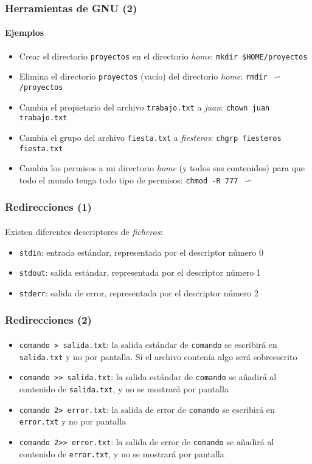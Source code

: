 \documentclass[12pt]{beamer}
\begin{document}
\begin{frame}
  \frametitle{Herramientas de GNU (2)}
  \framesubtitle{Ejemplos}
  \begin{itemize}
    \item Crear el directorio \texttt{proyectos} en el directorio \textit{home}: \texttt{mkdir \$HOME/proyectos}
    \medskip
    \item Elimina el directorio \texttt{proyectos} (\alert{vacío}) del directorio \textit{home}: \texttt{rmdir $\backsim$/proyectos}
    \medskip
    \item Cambia el propietario del archivo \texttt{trabajo.txt} a \textit{juan}: \texttt{chown juan trabajo.txt}
    \medskip
    \item Cambia el grupo del archivo \texttt{fiesta.txt} a \textit{fiesteros}: \texttt{chgrp fiesteros fiesta.txt}
    \medskip
    \item Cambia los permisos a mi directorio \textit{home} (y todos sus contenidos) para que todo el mundo tenga todo tipo de permisos: \texttt{chmod -R 777 $\backsim$}
  \end{itemize}
\end{frame}

\begin{frame}
  \frametitle{Redirecciones (1)}
  \framesubtitle{}
  Existen diferentes descriptores de \textit{ficheros}:
  \medskip
  \begin{itemize}
    \item \texttt{stdin}: entrada estándar, representada por el descriptor número 0
    \medskip
    \item \texttt{stdout}: salida estándar, representada por el descriptor número 1
    \medskip
    \item \texttt{stderr}: salida de error, representada por el descriptor número 2
  \end{itemize}

\end{frame}

\begin{frame}
  \frametitle{Redirecciones (2)}
  \framesubtitle{}
  \begin{itemize}
    \item \texttt{comando > salida.txt}: la salida estándar de \texttt{comando} se escribirá en \texttt{salida.txt} y no por pantalla. Si el archivo contenía algo será sobreescrito
    \medskip
    \item \texttt{comando >> salida.txt}: la salida estándar de \texttt{comando} se añadirá al contenido de \texttt{salida.txt}, y no se mostrará por pantalla
    \medskip
    \item \texttt{comando 2> error.txt}: la salida de error de \texttt{comando} se escribirá en \texttt{error.txt} y no por pantalla
    \medskip
    \item \texttt{comando 2>> error.txt}: la salida de error de \texttt{comando} se añadirá al contenido de \texttt{error.txt}, y no se mostrará por pantalla
  \end{itemize}
\end{frame}
\end{document}
